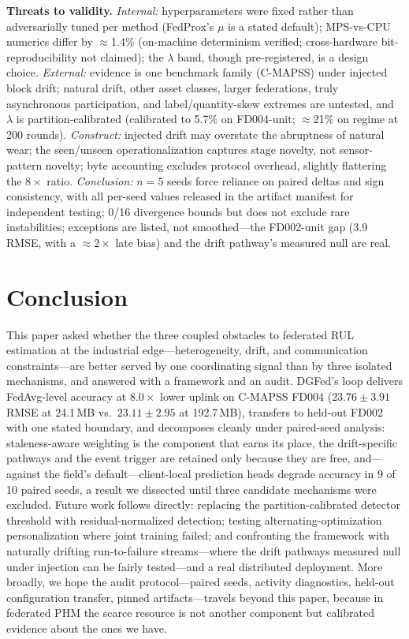 \documentclass[journal]{IEEEtran}
\newcommand{\dgfed}{DGFed}
\begin{document}
\textbf{Threats to validity.} \emph{Internal:} hyperparameters were fixed rather than adversarially tuned per method (FedProx's $\mu$ is a stated default); MPS-vs-CPU numerics differ by $\approx$1.4\% (on-machine determinism verified; cross-hardware bit-reproducibility not claimed); the $\lambda$ band, though pre-registered, is a design choice. \emph{External:} evidence is one benchmark family (C-MAPSS) under injected block drift; natural drift, other asset classes, larger federations, truly asynchronous participation, and label/quantity-skew extremes are untested, and $\lambda$ is partition-calibrated (calibrated to 5.7\% on FD004-unit; $\approx$21\% on regime at 200 rounds). \emph{Construct:} injected drift may overstate the abruptness of natural wear; the seen/unseen operationalization captures stage novelty, not sensor-pattern novelty; byte accounting excludes protocol overhead, slightly flattering the $8\times$ ratio. \emph{Conclusion:} $n=5$ seeds force reliance on paired deltas and sign consistency, with all per-seed values released in the artifact manifest for independent testing; 0/16 divergence bounds but does not exclude rare instabilities; exceptions are listed, not smoothed---the FD002-unit gap (3.9 RMSE, with a $\approx 2\times$ late bias) and the drift pathway's measured null are real.

\section{Conclusion}\label{sec:conclusion}
This paper asked whether the three coupled obstacles to federated RUL estimation at the industrial edge---heterogeneity, drift, and communication constraints---are better served by one coordinating signal than by three isolated mechanisms, and answered with a framework and an audit. \dgfed{}'s loop delivers FedAvg-level accuracy at $8.0\times$ lower uplink on C-MAPSS FD004 ($23.76 \pm 3.91$ RMSE at 24.1\,MB vs.\ $23.11 \pm 2.95$ at 192.7\,MB), transfers to held-out FD002 with one stated boundary, and decomposes cleanly under paired-seed analysis: staleness-aware weighting is the component that earns its place, the drift-specific pathways and the event trigger are retained only because they are free, and---against the field's default---client-local prediction heads degrade accuracy in 9 of 10 paired seeds, a result we dissected until three candidate mechanisms were excluded. Future work follows directly: replacing the partition-calibrated detector threshold with residual-normalized detection; testing alternating-optimization personalization where joint training failed; and confronting the framework with naturally drifting run-to-failure streams---where the drift pathways measured null under injection can be fairly tested---and a real distributed deployment. More broadly, we hope the audit protocol---paired seeds, activity diagnostics, held-out configuration transfer, pinned artifacts---travels beyond this paper, because in federated PHM the scarce resource is not another component but calibrated evidence about the ones we have.
\end{document}
